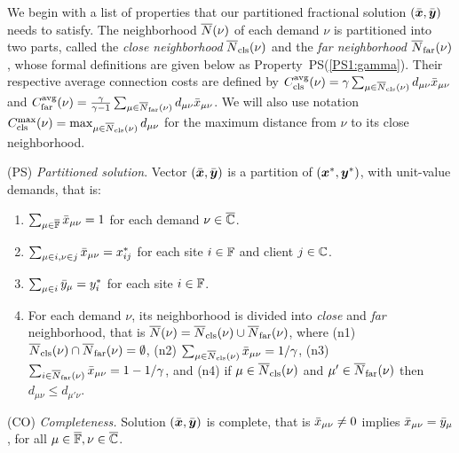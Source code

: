 \documentclass[11pt]{article}
\begin{document}
We begin with a list of properties that our partitioned
fractional solution $(\bar{\boldsymbol{x}},\bar{\boldsymbol{y}})$ needs to
satisfy. The neighborhood ${\overline{N}}(\nu)$ of each demand $\nu$
is partitioned into two parts, called the \emph{close
  neighborhood} ${\overline{N}}_{\text{cls}}(\nu)$ and the \emph{far
  neighborhood} ${\overline{N}}_{\text{far}}(\nu)$, whose formal definitions
are given below as Property~PS(\ref{PS1:gamma}). Their
respective average connection costs are defined by
$C_{\text{cls}}^{{\mbox{\scriptsize\rm avg}}}(\nu)=\gamma\sum_{\mu\in{\overline{N}}_{\text{cls}}(\nu)}
d_{\mu\nu}{\bar x}_{\mu\nu}$ and
$C_{\text{far}}^{{\mbox{\scriptsize\rm avg}}}(\nu)=\frac{\gamma}{\gamma-1}\sum_{\mu\in{\overline{N}}_{\text{far}}(\nu)}
d_{\mu\nu}{\bar x}_{\mu\nu}$.  We will also use notation
$C_{\text{cls}}^{\max}(\nu)=\max_{\mu\in{\overline{N}}_{\text{cls}}(\nu)} d_{\mu\nu}$ for
the maximum distance from $\nu$ to its close neighborhood.
\begin{description}
	
      \renewcommand{\theenumii}{(\alph{enumii})}
      \renewcommand{\labelenumii}{\theenumii}

\item{(PS)} \emph{Partitioned solution}.
Vector $(\bar{\boldsymbol{x}},\bar{\boldsymbol{y}})$ is a partition of $(\boldsymbol{x}^\ast,\boldsymbol{y}^\ast)$, with unit-value
  demands, that is:

	\begin{enumerate}
	\item \label{PS1:one} 
          $\sum_{\mu\in\overline{\mathbb{F}}} {\bar x}_{\mu\nu} = 1$ for each demand $\nu\in\overline{\mathbb{C}}$. 
	\item \label{PS1:xij} $\sum_{\mu\in i, \nu\in j} {\bar x}_{\mu\nu}
          = x^\ast_{ij}$ for each site $i\in\mathbb{F}$ and client $j\in\mathbb{C}$.
	\item \label{PS1:yi}
          $\sum_{\mu\in i} {\bar y}_{\mu} = y^\ast_i$ for each site $i\in\mathbb{F}$.
  \item \label{PS1:gamma}
	For each demand $\nu$, its neighborhood is divided into \emph{close} and
	\emph{far} neighborhood, that is ${\overline{N}}(\nu) = {\overline{N}}_{\text{cls}}(\nu) \cup {\overline{N}}_{\text{far}}(\nu)$, where
(n1) ${\overline{N}}_{\text{cls}}(\nu) \cap {\overline{N}}_{\text{far}}(\nu) = \emptyset$,
(n2) $\sum_{\mu\in{\overline{N}}_{\text{cls}}(\nu)} {\bar x}_{\mu\nu} =1/\gamma$,
(n3) $\sum_{i\in{\overline{N}}_{\text{far}}(\nu)} {\bar x}_{\mu\nu} =1-1/\gamma$,
and 
(n4) if $\mu\in {\overline{N}}_{\text{cls}}(\nu)$ and $\mu'\in {\overline{N}}_{\text{far}}(\nu)$ then $d_{\mu\nu}\le d_{\mu'\nu}$.   

	\end{enumerate}
		
\item{(CO)} \emph{Completeness.}
	Solution   $(\bar{\boldsymbol{x}},\bar{\boldsymbol{y}})$ is complete, that is ${\bar x}_{\mu\nu}\neq 0$ implies
				${\bar x}_{\mu\nu} = {\bar y}_{\mu}$, for all $\mu\in\overline{\mathbb{F}}, \nu\in\overline{\mathbb{C}}$.


\end{description}
\end{document}
